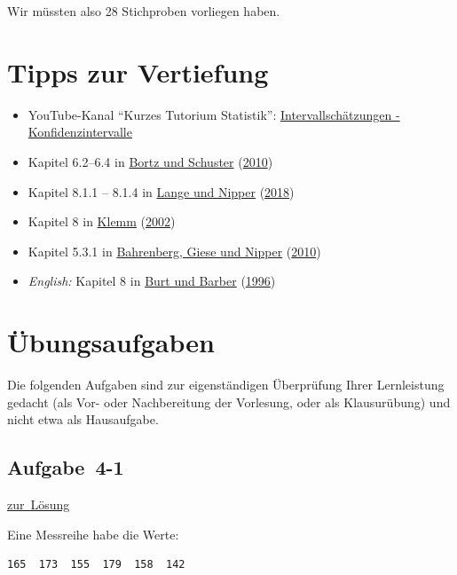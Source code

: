 \documentclass[
  11pt,
  ngerman,
  a4paper,
]{report}
\providecommand{\tightlist}{%
  \setlength{\itemsep}{0pt}\setlength{\parskip}{0pt}}
\begin{document}
Wir müssten also 28 Stichproben vorliegen haben.

\hypertarget{tipps-zur-vertiefung-3}{%
\section*{Tipps zur Vertiefung}\label{tipps-zur-vertiefung-3}}

\begin{itemize}
\tightlist
\item
  YouTube-Kanal \enquote{Kurzes Tutorium Statistik}: \href{https://www.youtube.com/watch?v=DdwTa28W4Os}{Intervallschätzungen - Konfidenzintervalle}
\item
  Kapitel 6.2--6.4 in \protect\hyperlink{ref-bortz}{Bortz und Schuster} (\protect\hyperlink{ref-bortz}{2010})
\item
  Kapitel 8.1.1 -- 8.1.4 in \protect\hyperlink{ref-delange}{Lange und Nipper} (\protect\hyperlink{ref-delange}{2018})
\item
  Kapitel 8 in \protect\hyperlink{ref-klemm}{Klemm} (\protect\hyperlink{ref-klemm}{2002})
\item
  Kapitel 5.3.1 in \protect\hyperlink{ref-bahrenberg}{Bahrenberg, Giese und Nipper} (\protect\hyperlink{ref-bahrenberg}{2010})
\item
  \emph{English:} Kapitel 8 in \protect\hyperlink{ref-burt}{Burt und Barber} (\protect\hyperlink{ref-burt}{1996})
\end{itemize}

\hypertarget{uxfcbungsaufgaben-3}{%
\section*{Übungsaufgaben}\label{uxfcbungsaufgaben-3}}

Die folgenden Aufgaben sind zur eigenständigen Überprüfung Ihrer Lernleistung gedacht (als Vor- oder Nachbereitung der Vorlesung, oder als Klausurübung) und nicht etwa als Hausaufgabe.

\hypertarget{aufgabe-4-1}{%
\subsection{Aufgabe~4-1}\label{aufgabe-4-1}}

\protect\hyperlink{loesung-4-1}{zur~Lösung}

Eine Messreihe habe die Werte:

\begin{verbatim}
165  173  155  179  158  142
\end{verbatim}
\end{document}
